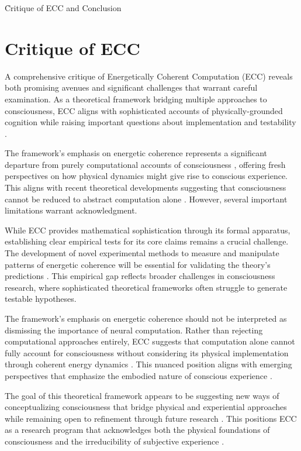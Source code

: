 \h{Critique of ECC and Conclusion}

\section{Critique of ECC}

\begin{refsection}

A comprehensive critique of Energetically Coherent Computation (ECC) reveals both promising avenues and significant challenges that warrant careful examination. As a theoretical framework bridging multiple approaches to consciousness, ECC aligns with sophisticated accounts of physically-grounded cognition while raising important questions about implementation and testability \cite{thompson2014waking, varela2016embodied}.

The framework's emphasis on energetic coherence represents a significant departure from purely computational accounts of consciousness \cite{koch2019feeling}, offering fresh perspectives on how physical dynamics might give rise to conscious experience. This aligns with recent theoretical developments suggesting that consciousness cannot be reduced to abstract computation alone \cite{dennett2017bacteria}. However, several important limitations warrant acknowledgment.

While ECC provides mathematical sophistication through its formal apparatus, establishing clear empirical tests for its core claims remains a crucial challenge. The development of novel experimental methods to measure and manipulate patterns of energetic coherence will be essential for validating the theory's predictions \cite{seth2021being}. This empirical gap reflects broader challenges in consciousness research, where sophisticated theoretical frameworks often struggle to generate testable hypotheses.

The framework's emphasis on energetic coherence should not be interpreted as dismissing the importance of neural computation. Rather than rejecting computational approaches entirely, ECC suggests that computation alone cannot fully account for consciousness without considering its physical implementation through coherent energy dynamics \cite{goff2019galileo}. This nuanced position aligns with emerging perspectives that emphasize the embodied nature of conscious experience \cite{noe2009out}.

The goal of this theoretical framework appears to be suggesting new ways of conceptualizing consciousness that bridge physical and experiential approaches while remaining open to refinement through future research \cite{chalmers2010character}. This positions ECC as a research program that acknowledges both the physical foundations of consciousness and the irreducibility of subjective experience \cite{churchland2013touching}.


\end{refsection}
